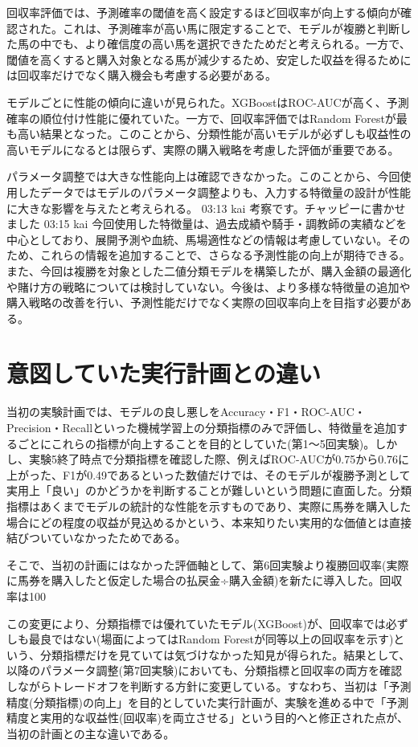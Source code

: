 \documentclass[dvipdfmx, a4paper, 11pt, titlepage]{jsarticle}
\begin{document}
回収率評価では、予測確率の閾値を高く設定するほど回収率が向上する傾向が確認された。これは、予測確率が高い馬に限定することで、モデルが複勝と判断した馬の中でも、より確信度の高い馬を選択できたためだと考えられる。一方で、閾値を高くすると購入対象となる馬が減少するため、安定した収益を得るためには回収率だけでなく購入機会も考慮する必要がある。

モデルごとに性能の傾向に違いが見られた。XGBoostはROC-AUCが高く、予測確率の順位付け性能に優れていた。一方で、回収率評価ではRandom Forestが最も高い結果となった。このことから、分類性能が高いモデルが必ずしも収益性の高いモデルになるとは限らず、実際の購入戦略を考慮した評価が重要である。

パラメータ調整では大きな性能向上は確認できなかった。このことから、今回使用したデータではモデルのパラメータ調整よりも、入力する特徴量の設計が性能に大きな影響を与えたと考えられる。
03:13 kai 考察です。チャッピーに書かせました
03:15 kai 今回使用した特徴量は、過去成績や騎手・調教師の実績などを中心としており、展開予測や血統、馬場適性などの情報は考慮していない。そのため、これらの情報を追加することで、さらなる予測性能の向上が期待できる。また、今回は複勝を対象とした二値分類モデルを構築したが、購入金額の最適化や賭け方の戦略については検討していない。今後は、より多様な特徴量の追加や購入戦略の改善を行い、予測性能だけでなく実際の回収率向上を目指す必要がある。


\section{意図していた実行計画との違い}
当初の実験計画では、モデルの良し悪しをAccuracy・F1・ROC-AUC・Precision・Recallといった機械学習上の分類指標のみで評価し、特徴量を追加するごとにこれらの指標が向上することを目的としていた(第1〜5回実験)。しかし、実験5終了時点で分類指標を確認した際、例えばROC-AUCが0.75から0.76に上がった、F1が0.49であるといった数値だけでは、そのモデルが複勝予測として実用上「良い」のかどうかを判断することが難しいという問題に直面した。分類指標はあくまでモデルの統計的な性能を示すものであり、実際に馬券を購入した場合にどの程度の収益が見込めるかという、本来知りたい実用的な価値とは直接結びついていなかったためである。

そこで、当初の計画にはなかった評価軸として、第6回実験より複勝回収率(実際に馬券を購入したと仮定した場合の払戻金÷購入金額)を新たに導入した。回収率は100%

この変更により、分類指標では優れていたモデル(XGBoost)が、回収率では必ずしも最良ではない(場面によってはRandom Forestが同等以上の回収率を示す)という、分類指標だけを見ていては気づけなかった知見が得られた。結果として、以降のパラメータ調整(第7回実験)においても、分類指標と回収率の両方を確認しながらトレードオフを判断する方針に変更している。すなわち、当初は「予測精度(分類指標)の向上」を目的としていた実行計画が、実験を進める中で「予測精度と実用的な収益性(回収率)を両立させる」という目的へと修正された点が、当初の計画との主な違いである。
\end{document}

